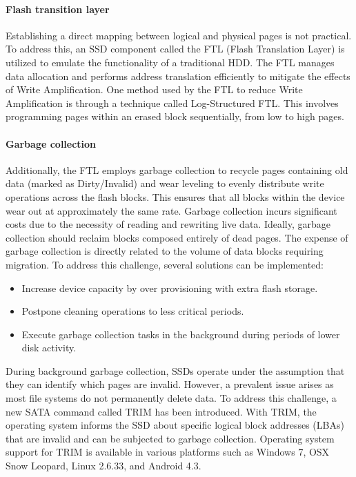\paragraph*{Flash transition layer}
Establishing a direct mapping between logical and physical pages is not practical. 
To address this, an SSD component called the FTL (Flash Translation Layer) is utilized to emulate the functionality of a traditional HDD. 
The FTL manages data allocation and performs address translation efficiently to mitigate the effects of Write Amplification.
One method used by the FTL to reduce Write Amplification is through a technique called Log-Structured FTL. 
This involves programming pages within an erased block sequentially, from low to high pages.

\paragraph*{Garbage collection}
Additionally, the FTL employs garbage collection to recycle pages containing old data (marked as Dirty/Invalid) and wear leveling to evenly distribute write operations across the flash blocks. 
This ensures that all blocks within the device wear out at approximately the same rate.
Garbage collection incurs significant costs due to the necessity of reading and rewriting live data. 
Ideally, garbage collection should reclaim blocks composed entirely of dead pages. 
The expense of garbage collection is directly related to the volume of data blocks requiring migration. 
To address this challenge, several solutions can be implemented:
\begin{itemize}
    \item Increase device capacity by over provisioning with extra flash storage.
    \item Postpone cleaning operations to less critical periods.
    \item Execute garbage collection tasks in the background during periods of lower disk activity.
\end{itemize}
During background garbage collection, SSDs operate under the assumption that they can identify which pages are invalid. 
However, a prevalent issue arises as most file systems do not permanently delete data. 
To address this challenge, a new SATA command called TRIM has been introduced.
With TRIM, the operating system informs the SSD about specific logical block addresses (LBAs) that are invalid and can be subjected to garbage collection. 
Operating system support for TRIM is available in various platforms such as Windows 7, OSX Snow Leopard, Linux 2.6.33, and Android 4.3.

